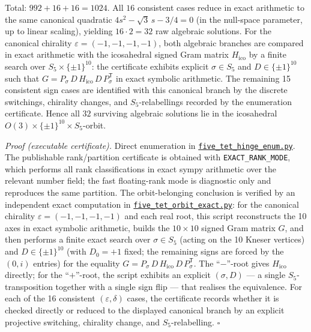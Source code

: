 \documentclass[
]{article}
\begin{document}
Total: \(992 + 16 + 16 = 1024\). All \(16\) consistent cases reduce in
exact arithmetic to the same canonical quadratic
\(4 s^2 - \sqrt{3}\,s - 3/4 = 0\) (in the null-space parameter, up to
linear scaling), yielding \(16 \cdot 2 = 32\) raw algebraic solutions.
For the canonical chirality \(\varepsilon = (-1,-1,-1,-1)\), both
algebraic branches are compared in exact arithmetic with the icosahedral
signed Gram matrix \(H_{\mathrm{ico}}\) by a finite search over
\(S_5 \times \{\pm 1\}^{10}\): the certificate exhibits explicit
\(\sigma \in S_5\) and \(D \in \{\pm 1\}^{10}\) such that
\(G = P_\sigma\,D\,H_{\mathrm{ico}}\,D\,P_\sigma^{\mathsf T}\) in exact
symbolic arithmetic. The remaining 15 consistent sign cases are
identified with this canonical branch by the discrete switchings,
chirality changes, and \(S_5\)-relabellings recorded by the enumeration
certificate. Hence all \(32\) surviving algebraic solutions lie in the
icosahedral \(O(3) \times \{\pm 1\}^{10} \times S_5\)-orbit.

\emph{Proof (executable certificate).} Direct enumeration in
\href{../scripts/five_tet_hinge_enum.py}{\texttt{five\_tet\_hinge\_enum.py}}.
The publishable rank/partition certificate is obtained with
\texttt{EXACT\_RANK\_MODE}, which performs all rank classifications in
exact sympy arithmetic over the relevant number field; the fast
floating-rank mode is diagnostic only and reproduces the same partition.
The orbit-belonging conclusion is verified by an independent exact
computation in
\href{../scripts/five_tet_orbit_exact.py}{\texttt{five\_tet\_orbit\_exact.py}}:
for the canonical chirality \(\varepsilon = (-1,-1,-1,-1)\) and each
real root, this script reconstructs the 10 axes in exact symbolic
arithmetic, builds the \(10 \times 10\) signed Gram matrix \(G\), and
then performs a finite exact search over \(\sigma \in S_5\) (acting on
the 10 Kneser vertices) and \(D \in \{\pm 1\}^{10}\) (with \(D_0 = +1\)
fixed; the remaining signs are forced by the \((0, i)\) entries) for the
equality \(G = P_\sigma\,D\,H_{\mathrm{ico}}\,D\,P_\sigma^{\mathsf T}\).
The ``\(-\)''-root gives \(H_{\mathrm{ico}}\) directly; for the
``\(+\)''-root, the script exhibits an explicit \((\sigma, D)\) --- a
single \(S_5\)-transposition together with a single sign flip --- that
realises the equivalence. For each of the 16 consistent
\((\varepsilon, \delta)\) cases, the certificate records whether it is
checked directly or reduced to the displayed canonical branch by an
explicit projective switching, chirality change, and
\(S_5\)-relabelling. \(\square\)
\end{document}
